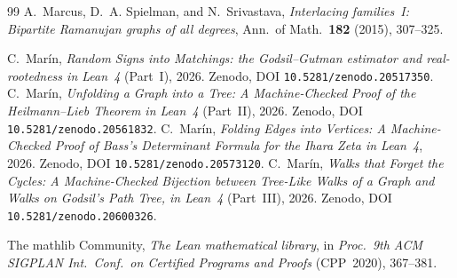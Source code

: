 \documentclass[11pt]{article}
\begin{document}
\begin{thebibliography}{99}
 A.~Marcus, D.~A. Spielman, and N.~Srivastava, \emph{Interlacing families~I: Bipartite
Ramanujan graphs of all degrees}, Ann.\ of Math.\ \textbf{182} (2015), 307--325.

 C.~Mar\'in, \emph{Random Signs into Matchings: the Godsil--Gutman estimator and
real-rootedness in Lean~4} (Part~I), 2026. Zenodo, DOI \texttt{10.5281/zenodo.20517350}.
 C.~Mar\'in, \emph{Unfolding a Graph into a Tree: A Machine-Checked Proof of the
Heilmann--Lieb Theorem in Lean~4} (Part~II), 2026. Zenodo, DOI \texttt{10.5281/zenodo.20561832}.
 C.~Mar\'in, \emph{Folding Edges into Vertices: A Machine-Checked Proof of Bass's
Determinant Formula for the Ihara Zeta in Lean~4}, 2026. Zenodo, DOI
\texttt{10.5281/zenodo.20573120}.
 C.~Mar\'in, \emph{Walks that Forget the Cycles: A Machine-Checked Bijection between
Tree-Like Walks of a Graph and Walks on Godsil's Path Tree, in Lean~4} (Part~III), 2026. Zenodo, DOI
\texttt{10.5281/zenodo.20600326}.

 The mathlib Community, \emph{The Lean mathematical library}, in \emph{Proc.\ 9th
ACM SIGPLAN Int.\ Conf.\ on Certified Programs and Proofs} (CPP~2020), 367--381.

\end{thebibliography}
\end{document}
